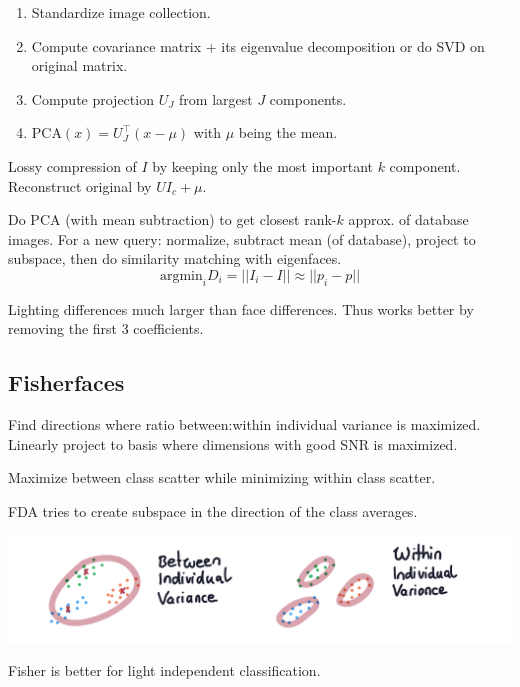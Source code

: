 \begin{definition}
  \begin{enumerate}
    \item Standardize image collection.
    \item Compute covariance matrix + its eigenvalue decomposition or do SVD on original matrix.
    \item Compute projection \(U_J\) from largest \(J\) components.
    \item \(\text{PCA}(x) = U_J^\top(x - \mu)\) with \(\mu\) being the mean.
  \end{enumerate}
\end{definition}

\begin{definition}
  Lossy compression of \(I\) by keeping only the most important \(k\) component. Reconstruct original by \(UI_c + \mu\).
\end{definition}

\begin{algorithm}
  Do PCA (with mean subtraction) to get closest rank-\(k\) approx. of database images. For a new query: normalize, subtract mean (of database), project to subspace, then do similarity matching with eigenfaces.
  \[\text{argmin}_i D_i = ||I_i - I|| \approx ||p_i - p||\]
\end{algorithm}

\begin{theorem}
  Lighting differences much larger than face differences. Thus works better by removing the first 3 coefficients.
\end{theorem}

\subsection{Fisherfaces}
Find directions where ratio between:within individual variance is maximized. Linearly project to basis where dimensions with good SNR is maximized.

\begin{algorithm}
  Maximize between class scatter while minimizing within class scatter.
\end{algorithm}

FDA tries to create subspace in the direction of the class averages.

\includegraphics*[width=\linewidth]{assets/variances.png}

Fisher is better for light independent classification.
